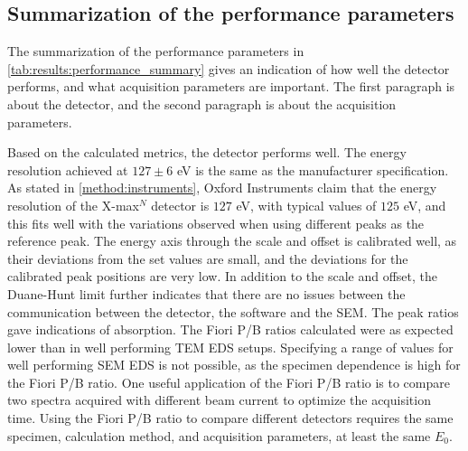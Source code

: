 \subsection{Summarization of the performance parameters}
\label{discussion:summarization_of_the_performance_parameters}

The summarization of the performance parameters in \cref{tab:results:performance_summary} gives an indication of how well the detector performs, and what acquisition parameters are important.
The first paragraph is about the detector, and the second paragraph is about the acquisition parameters.


Based on the calculated metrics, the detector performs well.
The energy resolution achieved at $127 \pm6$ eV is the same as the manufacturer specification.
As stated in \cref{method:instruments}, Oxford Instruments claim that the energy resolution of the X-max$^N$ detector is $127$ eV\cite{oxford_xmax_80}, with typical values of $125$ eV, and this fits well with the variations observed when using different peaks as the reference peak.
The energy axis through the scale and offset is calibrated well, as their deviations from the set values are small, and the deviations for the calibrated peak positions are very low.
In addition to the scale and offset, the Duane-Hunt limit further indicates that there are no issues between the communication between the detector, the software and the SEM.
The peak ratios gave indications of absorption.
The Fiori P/B ratios calculated were as expected lower than in well performing TEM EDS setups.
Specifying a range of values for well performing SEM EDS is not possible, as the specimen dependence is high for the Fiori P/B ratio.
One useful application of the Fiori P/B ratio is to compare two spectra acquired with different beam current to optimize the acquisition time.
Using the Fiori P/B ratio to compare different detectors requires the same specimen, calculation method, and acquisition parameters, at least the same $E_0$.


